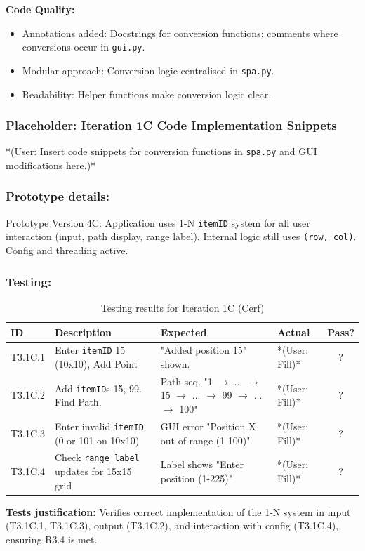\textbf{Code Quality:}
\begin{itemize}
	\item Annotations added: Docstrings for conversion functions; comments where conversions occur in \verb|gui.py|.
	\item Modular approach: Conversion logic centralised in \verb|spa.py|.
	\item Readability: Helper functions make conversion logic clear.
\end{itemize}

\newpage
\subsubsection*{Placeholder: Iteration 1C Code Implementation Snippets}
*(User: Insert code snippets for conversion functions in \verb|spa.py| and GUI modifications here.)*
\newpage

\subsubsection{Prototype details:}
Prototype Version 4C: Application uses 1-N \verb|itemID| system for all user interaction (input, path display, range label). Internal logic still uses \verb|(row, col)|. Config and threading active.

\subsubsection{Testing:}
\begin{table}[htbp]
	\centering
	\begin{tabularx}{\textwidth}{|l|X|p{4.5cm}|p{1.5cm}|c|}
		\hline
		\textbf{ID} & \textbf{Description} & \textbf{Expected} & \textbf{Actual} & \textbf{Pass?} \\
		\hline
		T3.1C.1 & Enter \verb|itemID| 15 (10x10), Add Point & "Added position 15" shown. & *(User: Fill)* & ? \\
		\hline
		T3.1C.2 & Add \verb|itemID|s 15, 99. Find Path. & Path seq. "1 $ \rightarrow $ ... $ \rightarrow $ 15 $ \rightarrow $ ... $ \rightarrow $ 99 $ \rightarrow $ ... $ \rightarrow $ 100" & *(User: Fill)* & ? \\
		\hline
		T3.1C.3 & Enter invalid \verb|itemID| (0 or 101 on 10x10) & GUI error "Position X out of range (1-100)" & *(User: Fill)* & ? \\
		\hline
		T3.1C.4 & Check \verb|range_label| updates for 15x15 grid & Label shows "Enter position (1-225)" & *(User: Fill)* & ? \\
		\hline
	\end{tabularx}
	\caption{Testing results for Iteration 1C (Cerf)}
\end{table}
\textbf{Tests justification:} Verifies correct implementation of the 1-N system in input (T3.1C.1, T3.1C.3), output (T3.1C.2), and interaction with config (T3.1C.4), ensuring R3.4 is met.

